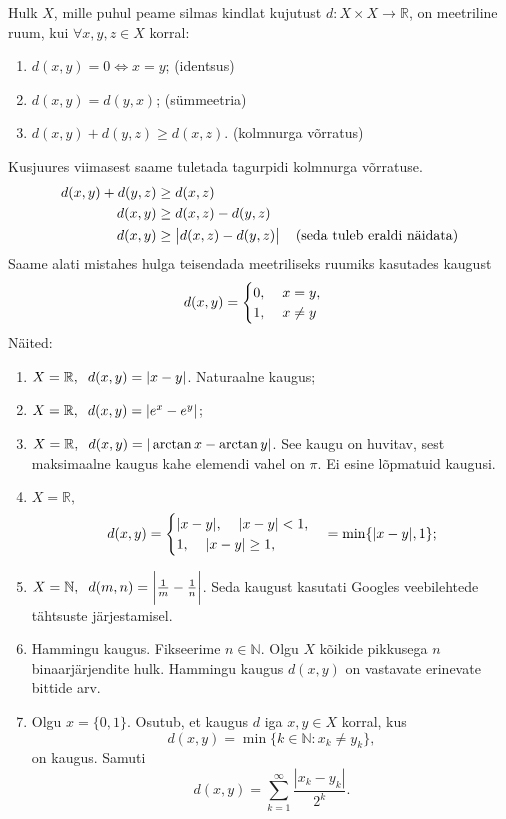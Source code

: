 \documentclass{article}[12pt]
\newcommand{\h}{\hspace{0.2cm}}
\newcommand{\R}{\mathbb{R}}
\newcommand{\N}{\mathbb{N}}
\theoremstyle{definition}
\theoremstyle{definition}
\theoremstyle{definition}
\theoremstyle{break}
\begin{document}
Hulk $X$, mille puhul peame silmas kindlat kujutust $d: X\times X\rightarrow \R$, on meetriline ruum, kui $\forall x,y,z\in X$ korral:
\begin{enumerate}
	\item $d(x,y)=0 \Leftrightarrow x=y$; \hfill (identsus)
	\item $d(x,y) = d(y,x)$; \hfill (sümmeetria)
	\item $d(x,y) + d(y,z) \geq d(x,z)$. \hfill (kolmnurga võrratus)
\end{enumerate}
Kusjuures viimasest saame tuletada tagurpidi kolmnurga võrratuse.
\begin{align*}
	d(x,y) + d(y,z) &\geq d(x,z) \\
	d(x,y) &\geq d(x,z) - d(y,z) \\
	d(x,y) &\geq \big\lvert d(x,z) - d(y,z) \big\rvert \h\h\text{(seda tuleb eraldi näidata)} \\
\end{align*} 
Saame alati mistahes hulga teisendada meetriliseks ruumiks kasutades kaugust
\[
	d(x,y) = \begin{cases}
		0,\h\h x=y, \\
		1,\h\h x\neq y
	\end{cases}
\]
Näited:
\begin{enumerate}
	\item $X=\R,\h d(x,y) = |x-y|$. Naturaalne kaugus;
	\item $X=\R,\h d(x,y) = |e^x-e^y|$;
	\item $X=\R,\h d(x,y) = |\arctan x - \arctan y|$. See kaugu on huvitav, sest maksimaalne kaugus kahe elemendi vahel on $\pi$. Ei esine lõpmatuid kaugusi.
	\item $X=\R,$
	\[
		d(x,y) = \begin{cases}
			|x-y|,\h\h |x-y| < 1, \\
			1,\h\h |x-y| \geq 1, \\
		\end{cases} = \min \{ |x-y|, 1 \};
	\]
	\item $X=\N,\h d(m,n) = \bigg\lvert \frac{1}{m} - \frac{1}{n} \bigg\rvert$. Seda kaugust kasutati Googles veebilehtede tähtsuste järjestamisel.
	\item Hammingu kaugus.
	Fikseerime $n\in \N$. 
	Olgu $X$ kõikide pikkusega $n$ binaarjärjendite hulk. 
	Hammingu kaugus $d(x,y)$ on vastavate erinevate bittide arv.
	\item Olgu $x=\{0,1\}$. Osutub, et kaugus $d$ iga $x,y\in X$ korral, kus
	\[
		d(x,y) = \min \{ k\in \N: x_k \neq y_k \},
	\]
	on kaugus. Samuti
	\[
		d(x,y) = \sum_{k=1}^\infty \frac{ |x_k-y_k| }{2^k}.
	\]
\end{enumerate}
\end{document}

